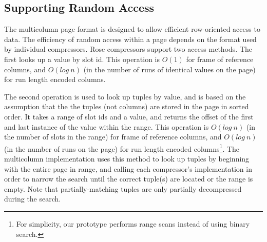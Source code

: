 \documentclass{vldb}
\newcommand{\rows}{Rose\xspace}
\newcommand{\rowss}{Rose's\xspace}
\begin{document}

\subsection{Supporting Random Access}

The multicolumn page format is designed to allow efficient
row-oriented access to data.  The efficiency of random access within a
page depends on the format used by individual compressors.  \rows
compressors support two access methods.  The first looks up a value by
slot id.  This operation is $O(1)$ for frame of reference columns, and
$O(log~n)$ (in the number of runs of identical values on the page) for
run length encoded columns.

The second operation is used to look up tuples by value, and is based
on the assumption that the the tuples (not columns) are stored in the page in sorted
order.  It takes a range of slot ids and a value, and returns the
offset of the first and last instance of the value within the range.
This operation is $O(log~n)$ (in the number of slots in the range)
for frame of reference columns, and $O(log~n)$ (in the number of runs
on the page) for run length encoded columns\footnote{For simplicity,
our prototype performs range scans instead of using binary search.}.  The multicolumn
implementation uses this method to look up tuples by beginning with
the entire page in range, and calling each compressor's implementation
in order to narrow the search until the correct tuple(s) are located
or the range is empty.  Note that partially-matching tuples are only
partially decompressed during the search.

\end{document}
